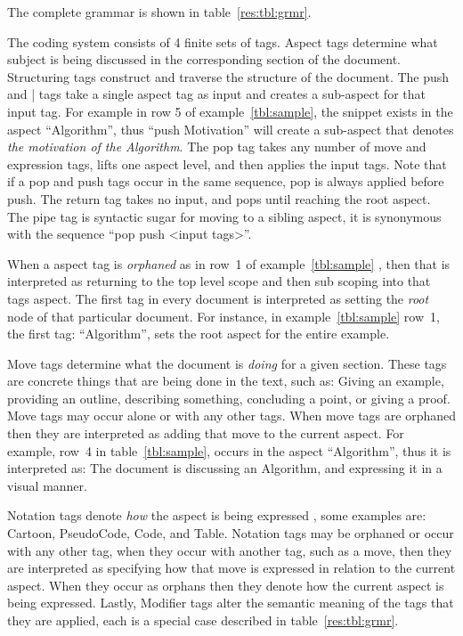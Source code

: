 \documentclass[sigconf]{acmart}
\begin{document}
The complete grammar is shown in table~\ref{res:tbl:grmr}.



The coding system consists of 4 finite sets of tags. Aspect tags determine what
subject is being discussed in the corresponding section of the document.
%
Structuring tags construct and traverse the structure of the document. The
push and | tags take a single aspect tag as input and creates a sub-aspect
for that input tag. For example in row 5 of example~\ref{tbl:sample}, the
snippet exists in the aspect ``Algorithm'', thus ``push Motivation'' will
create a sub-aspect that denotes \emph{the motivation of the Algorithm}.
%
The pop tag takes any number of move and expression tags, lifts one aspect
level, and then applies the input tags. Note that if a pop and push tags occur
in the same sequence, pop is always applied before push. The return tag takes no
input, and pops until reaching the root aspect. The pipe tag is syntactic sugar
for moving to a sibling aspect, it is synonymous with the sequence ``pop push
<input tags>''.


When a aspect tag is \emph{orphaned} as in row~1 of example~\ref{tbl:sample}
, then that is interpreted as returning to the
top level scope and then sub scoping into that tags aspect. The first tag in
every document is interpreted as setting the \emph{root} node of that particular
document. For instance, in example~\ref{tbl:sample} row~1, the first tag:
``Algorithm'', sets the root aspect for the entire example.

Move tags determine what the document is \emph{doing} for a given section.
These tags are concrete things that are being done in the text, such as: Giving
an example, providing an outline, describing something, concluding a point, or
giving a proof. Move tags may occur alone or with any other tags. When move
tags are orphaned then they are interpreted as adding that move to the current
aspect. For example, row~4 in table~\ref{tbl:sample}, occurs in the
aspect ``Algorithm'', thus it is interpreted as: The document is discussing
an Algorithm, and expressing it in a visual manner.

Notation tags denote \emph{how} the aspect is being expressed , some examples
are: Cartoon, PseudoCode, Code, and Table. Notation tags may be orphaned or
occur with any other tag, when they occur with another tag, such as a move, then
they are interpreted as specifying how that move is expressed in relation to the
current aspect. When they occur as orphans then they denote how the current
aspect is being expressed. Lastly, Modifier tags alter the semantic meaning of
the tags that they are applied, each is a special case described in
table~\ref{res:tbl:grmr}.
%
\end{document}
